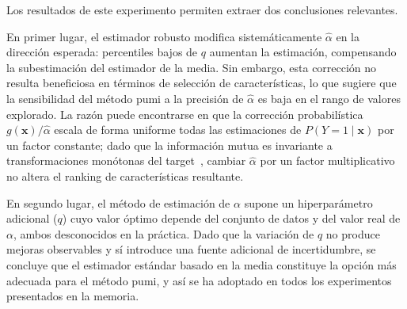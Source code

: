 Los resultados de este experimento permiten extraer dos conclusiones relevantes.

En primer lugar, el estimador robusto modifica sistemáticamente $\hat{\alpha}$ en la dirección esperada: percentiles bajos de $q$ aumentan la estimación, compensando la subestimación del estimador de la media. Sin embargo, esta corrección no resulta beneficiosa en términos de selección de características, lo que sugiere que la sensibilidad del método \acrshort{pumi} a la precisión de $\hat{\alpha}$ es baja en el rango de valores explorado. La razón puede encontrarse en que la corrección probabilística $g(\mathbf{x})/\hat{\alpha}$ escala de forma uniforme todas las estimaciones de $P(Y=1 \mid \mathbf{x})$ por un factor constante; dado que la información mutua es invariante a transformaciones monótonas del target~\cite{cover2006elements}, cambiar $\hat{\alpha}$ por un factor multiplicativo no altera el ranking de características resultante.

En segundo lugar, el método de estimación de $\alpha$ supone un hiperparámetro adicional ($q$) cuyo valor óptimo depende del conjunto de datos y del valor real de $\alpha$, ambos desconocidos en la práctica. Dado que la variación de $q$ no produce mejoras observables y sí introduce una fuente adicional de incertidumbre, se concluye que el estimador estándar basado en la media constituye la opción más adecuada para el método \acrshort{pumi}, y así se ha adoptado en todos los experimentos presentados en la memoria.